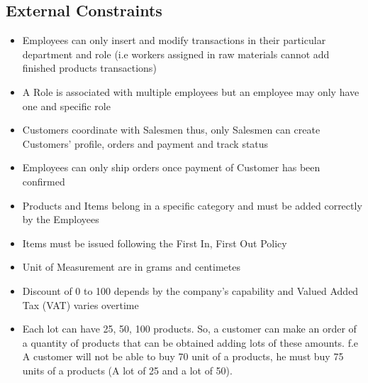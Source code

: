\subsection{External Constraints}
\begin{itemize}
\item Employees can only insert and modify transactions in their particular department and role (i.e workers assigned in raw materials cannot add finished products transactions)
\item A Role is associated with multiple employees but an employee may only have one and specific role
\item Customers coordinate with Salesmen thus, only Salesmen can create Customers' profile, orders and payment and track status
\item Employees can only ship orders once payment of Customer has been confirmed
\item Products and Items belong in a specific category and must be added correctly by the Employees
\item Items must be issued following the First In, First Out Policy
\item Unit of Measurement are in grams and centimetes
\item Discount of 0 to 100 depends by the company's capability and Valued Added Tax (VAT) varies overtime
\item Each lot can have 25, 50, 100 products. So, a customer can make an order of a quantity of products that can be obtained adding lots of these amounts. f.e A customer will not be able to buy 70 unit of a products, he must buy 75 units of a products (A lot of 25 and a lot of 50).
\end{itemize}